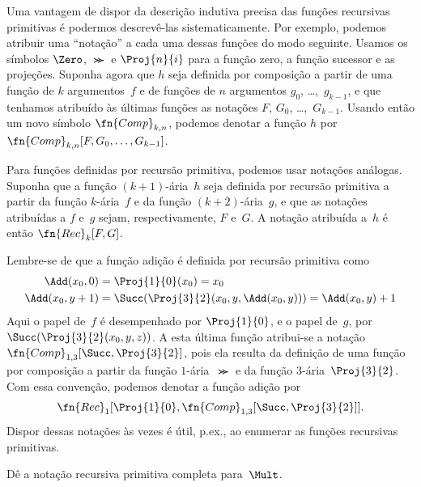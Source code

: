 \documentclass[../../../include/open-logic-section]{subfiles}
\begin{document}

Uma vantagem de dispor da descrição indutiva precisa das funções recursivas
primitivas é podermos descrevê-las sistematicamente. Por exemplo, podemos
atribuir uma ``notação'' a cada uma dessas funções do modo seguinte. Usamos os
símbolos $\Zero$, $\Succ$ e $\Proj{n}{i}$ para a função zero, a função sucessor
e as projeções. Suponha agora que $h$ seja definida por composição a partir de
uma função de $k$ argumentos~$f$ e de funções de $n$ argumentos $g_0$,
\dots,~$g_{k-1}$, e que tenhamos atribuído às últimas funções as notações $F$, $G_0$,
\dots,~$G_{k-1}$. Usando então um novo símbolo $\fn{Comp}_{k,n}$, podemos
denotar a função $h$ por $\fn{Comp}_{k,n}[F,G_0,\dots,G_{k-1}]$.

Para funções definidas por recursão primitiva, podemos usar notações análogas.
Suponha que a função $(k+1)$-ária~$h$ seja definida por recursão primitiva a
partir da função $k$-ária~$f$ e da função $(k+2)$-ária~$g$, e que as notações
atribuídas a $f$ e~$g$ sejam, respectivamente, $F$ e~$G$. A notação atribuída
a~$h$ é então $\fn{Rec}_k[F,G]$.

Lembre-se de que a função adição é definida por recursão primitiva como
\begin{align*}
  \Add(x_0, 0) & = \Proj{1}{0}(x_0) = x_0\\
  \Add(x_0, y+1) & = \Succ(\Proj{3}{2}(x_0, y, \Add(x_0, y))) = \Add(x_0, y) +1
\end{align*}
Aqui o papel de~$f$ é desempenhado por $\Proj{1}{0}$, e o papel de~$g$, por
$\Succ(\Proj{3}{2}(x_0, y, z))$. A esta última função atribui-se a notação
$\fn{Comp}_{1,3}[\Succ,\Proj{3}{2}]$, pois ela resulta da definição de uma
função por composição a partir da função $1$-ária~$\Succ$ e da função
$3$-ária~$\Proj{3}{2}$. Com essa convenção, podemos denotar a função adição por
\[
\fn{Rec}_1[\Proj{1}{0},\fn{Comp}_{1,3}[\Succ,\Proj{3}{2}]].
\]
Dispor dessas notações às vezes é útil, p.ex., ao enumerar as funções
recursivas primitivas.

\begin{prob}
  Dê a notação recursiva primitiva completa para~$\Mult$.
\end{prob}
\end{document}
